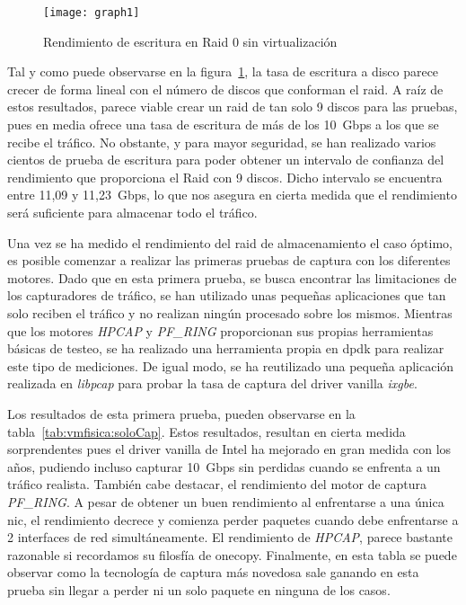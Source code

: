 \begin{figure}[!htb]
\centering
\texttt{[image: graph1]}
\caption{Rendimiento de escritura en Raid 0 sin virtualización}
\label{fig:vmfisica:graphdd}
\end{figure}

Tal y como puede observarse en la figura~\ref{fig:vmfisica:graphdd}, la tasa de escritura a disco parece crecer de forma lineal con el número de discos que conforman el raid. A raíz de estos resultados, parece viable crear un raid de tan solo 9 discos para las pruebas, pues en media ofrece una tasa de escritura de más de los 10~Gbps a los que se recibe el tráfico. No obstante, y para mayor seguridad, se han realizado varios cientos de prueba de escritura para poder obtener un intervalo de confianza del rendimiento que proporciona el Raid con 9 discos. Dicho intervalo se encuentra entre 11,09 y 11,23~Gbps, lo que nos asegura en cierta medida que el rendimiento será suficiente para almacenar todo el tráfico.

Una vez se ha medido el rendimiento del raid de almacenamiento el caso óptimo, es posible comenzar a realizar las primeras pruebas de captura con los diferentes motores.
Dado que en esta primera prueba, se busca encontrar las limitaciones de los capturadores de tráfico, se han utilizado unas pequeñas aplicaciones que tan solo reciben el tráfico y no realizan ningún procesado sobre los mismos. Mientras que los motores \textit{HPCAP} y \textit{PF\_RING} proporcionan sus propias herramientas básicas de testeo, se ha realizado una herramienta propia en \gls{dpdk} para realizar este tipo de mediciones. De igual modo, se ha reutilizado una pequeña aplicación realizada en \textit{libpcap} para probar la tasa de captura del driver \gls{vanilla} \textit{ixgbe}.

Los resultados de esta primera prueba, pueden observarse en la tabla~\ref{tab:vmfisica:soloCap}. Estos resultados, resultan en cierta medida sorprendentes pues el driver \gls{vanilla} de Intel ha mejorado en gran medida con los años, pudiendo incluso capturar 10~Gbps sin perdidas cuando se enfrenta a un tráfico realista.
También cabe destacar, el rendimiento del motor de captura \textit{PF\_RING}. A pesar de obtener un buen rendimiento al enfrentarse a una única \gls{nic}, el rendimiento decrece y comienza perder paquetes cuando debe enfrentarse a 2 interfaces de red simultáneamente.
El rendimiento de \textit{HPCAP}, parece bastante razonable si recordamos su filosfía de \gls{onecopy}. Finalmente, en esta tabla se puede observar como la tecnología de captura más novedosa sale ganando en esta prueba sin llegar a perder ni un solo paquete en ninguna de los casos.

